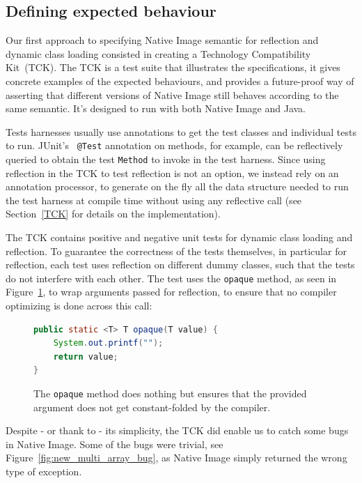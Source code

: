 \subsection{Defining expected behaviour}
Our first approach to specifying Native Image semantic for reflection and dynamic class loading consisted in creating a Technology Compatibility Kit~(TCK). The TCK is a test suite that illustrates the specifications, it gives concrete examples of the expected behaviours, and provides a future-proof way of asserting that different versions of Native Image still behaves according to the same semantic.
It's designed to run with both Native Image and Java.

Tests harnesses usually use annotations to get the test classes and individual tests to run. JUnit's~\cite{noauthor_junit_nodate} \verb|@Test| annotation on methods, for example, can be reflectively queried to obtain the test \verb|Method| to invoke in the test harness.   
Since using reflection in the TCK to test reflection is not an option, we instead rely on an annotation processor, to generate on the fly all the data structure needed to run the test harness at compile time without using any reflective call (see Section~\ref{TCK} for details on the implementation). 

The TCK contains positive and negative unit tests for dynamic class loading and reflection. To guarantee the correctness of the tests themselves, in particular for reflection, each test uses reflection on different dummy classes, such that the tests do not interfere with each other.
The test uses the \verb|opaque| method, as seen in Figure~\ref{fig:opaque}, to wrap arguments passed for reflection, to ensure that no compiler optimizing is done across this call:
\begin{figure}[ht]
    \centering
\begin{lstlisting}[language=Java]
public static <T> T opaque(T value) {
    System.out.printf("");
    return value;
}
\end{lstlisting}
    \caption{The \texttt{opaque} method does nothing but ensures that the provided argument does not get constant-folded by the compiler.}
    \label{fig:opaque}
\end{figure}

Despite - or thank to - its simplicity, the TCK did enable us to catch some bugs in Native Image.
Some of the bugs were trivial, see Figure~\ref{fig:new_multi_array_bug}, as Native Image simply returned the wrong type of exception. 

